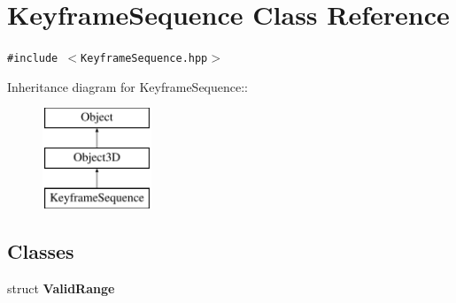 \hypertarget{classm3g_1_1KeyframeSequence}{
\section{KeyframeSequence Class Reference}
\label{classm3g_1_1KeyframeSequence}
}
{\tt \#include $<$KeyframeSequence.hpp$>$}

Inheritance diagram for KeyframeSequence::\begin{figure}[H]
\begin{center}
\leavevmode
\includegraphics[height=3cm]{classm3g_1_1KeyframeSequence}
\end{center}
\end{figure}
\subsection*{Classes}
\begin{CompactItemize}
\item 
struct \textbf{ValidRange}
\end{CompactItemize}
